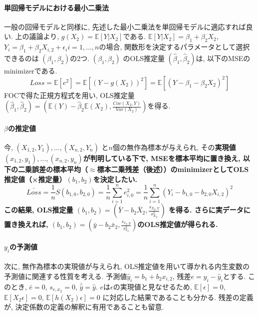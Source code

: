 \documentclass[paper=a4paper,fontsize=10pt]{jlreq}
\begin{document}
\paragraph{単回帰モデルにおける最小二乗法}
一般の回帰モデルと同様に, 先述した最小二乗法を単回帰モデルに適応すれば良い. 上の議論より, $g(X_2)=\mathbb{E}[Y|X_{2}]$である. $\mathbb{E}[Y|X_{2}]=\beta_1+\beta_2X_{2}$, $Y_i = \beta_1+\beta_2X_{i,2}+\epsilon_i　i=1,\dots, n$の場合, 関数形を決定するパラメータとして選択できるのは $(\beta_1, \beta_2)$の2つ. $(\beta_1, \beta_2)$ のOLS推定量 $(\hat{\beta}_1, \hat{\beta}_2)$は, 以下のMSEのminimizerである.
\begin{equation*}
  Loss=\mathbb{E}[e^{2}]=\mathbb{E}[(Y-g(X_2))^{2}]=\mathbb{E}[(Y-\beta_1-\beta_2X_{2})^{2}]
\end{equation*}
FOCで得た正規方程式を用い, OLS推定量 $(\hat{\beta}_1, \hat{\beta}_2)=(\mathbb{E}(Y)-\hat{\beta}_2\mathbb{E}(X_2), \frac{Cov(X_2,Y)}{Var(X_2)})$を得る.\\

\paragraph{$\beta$の推定値}
今, $(X_{1,2}, Y_1), \dots, (X_{n,2}, Y_n)$ と$n$個の無作為標本が与えられ, その\rmfamily\mcfamily\bfseries{実現値}\mdseries $(x_{1,2}, y_1), \dots, (x_{n,2}, y_n)$が判明している下で, MSEを\rmfamily\mcfamily\bfseries{標本平均に置き換え}\mdseries , 以下の二乗誤差の標本平均（$\approx$標本二乗残差（後述））のminimizerとしてOLS推定値（×推定量）$(b_1, b_2)$を決定したい.
\begin{equation*}
  \bar{Loss}=\frac{1}{n}S(b_{1,0}, b_{2, 0})=\frac{1}{n}\sum_{i = 1}^{n} e_{i, 0}^{2}=\frac{1}{n}\sum_{i = 1}^{n} (Y_i-b_{1, 0}-b_{2, 0}X_{i, 2})^{2}
\end{equation*}
この結果, OLS推定量 $(b_1, b_2)=(\bar{Y}-b_2\bar{X}_2, \frac{s_{X_2,Y}}{s^{2}_{X_2}})$ を得る. さらに実データに置き換えれば, $(b_1, b_2)=(\bar{y}-b_2\bar{x}_2, \frac{s_{x_2,y}}{s^{2}_{x_2}})$のOLS推定値が得られる.\\

\paragraph{$y_i$の予測値}
次に, 無作為標本の実現値が与えられ, OLS推定値を用いて導かれる内生変数の予測値に関連する性質を考える. 予測値$\hat{y}_i=b_1+b_2x_{i, 2}$, 残差$e=y_i-\hat{y}_i$とする. このとき, $\bar{e}=0$, $s_{e, x_2}=0$, $\bar{\hat{y}}=\hat{y}$. $e$は$\epsilon$の実現値と見なせるため, $\mathbb{E}[\epsilon]=0$, $\mathbb{E}[X_{2}\epsilon]=0$, $\mathbb{E}[h(X_{2})\epsilon]=0$ に対応した結果であることも分かる. 残差の定義が, 決定係数の定義の解釈に有用であることも留意.\\
\end{document}
